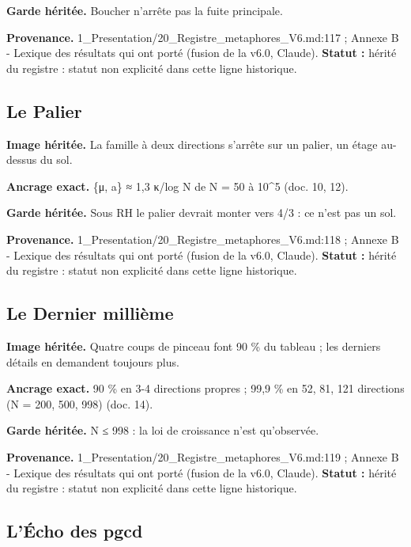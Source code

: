 \documentclass[
  9pt,
  a4paper,
]{article}
\begin{document}
\textbf{Garde héritée.} Boucher n'arrête pas la fuite principale.

\textbf{Provenance.} 1\_Presentation/20\_Registre\_metaphores\_V6.md:117
; Annexe B - Lexique des résultats qui ont porté (fusion de la v6.0,
Claude). \textbf{Statut :} hérité du registre : statut non explicité
dans cette ligne historique.

\hypertarget{le-palier}{%
\subsection{Le Palier}\label{le-palier}}

\textbf{Image héritée.} La famille à deux directions s'arrête sur un
palier, un étage au-dessus du sol.

\textbf{Ancrage exact.} \{μ, a\} ≈ 1,3 κ/log N de N = 50 à 10\^{}5 (doc.
10, 12).

\textbf{Garde héritée.} Sous RH le palier devrait monter vers 4/3 : ce
n'est pas un sol.

\textbf{Provenance.} 1\_Presentation/20\_Registre\_metaphores\_V6.md:118
; Annexe B - Lexique des résultats qui ont porté (fusion de la v6.0,
Claude). \textbf{Statut :} hérité du registre : statut non explicité
dans cette ligne historique.

\hypertarget{le-dernier-milliuxe8me}{%
\subsection{Le Dernier millième}\label{le-dernier-milliuxe8me}}

\textbf{Image héritée.} Quatre coups de pinceau font 90 \% du tableau ;
les derniers détails en demandent toujours plus.

\textbf{Ancrage exact.} 90 \% en 3-4 directions propres ; 99,9 \% en 52,
81, 121 directions (N = 200, 500, 998) (doc. 14).

\textbf{Garde héritée.} N ≤ 998 : la loi de croissance n'est
qu'observée.

\textbf{Provenance.} 1\_Presentation/20\_Registre\_metaphores\_V6.md:119
; Annexe B - Lexique des résultats qui ont porté (fusion de la v6.0,
Claude). \textbf{Statut :} hérité du registre : statut non explicité
dans cette ligne historique.

\hypertarget{luxe9cho-des-pgcd}{%
\subsection{L'Écho des pgcd}\label{luxe9cho-des-pgcd}}
\end{document}
